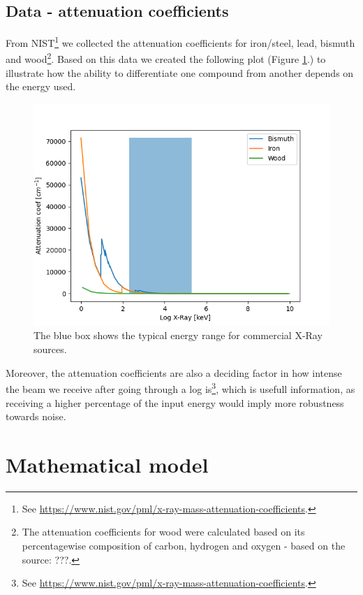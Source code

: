 \documentclass{article}
\begin{document}
\subsection{Data - attenuation coefficients} \label{NISTDATA}
From NIST\footnote{See \url{https://www.nist.gov/pml/x-ray-mass-attenuation-coefficients}.} we collected the attenuation coefficients for iron/steel, lead, bismuth and wood\footnote{The attenuation coefficients for wood were calculated based on its percentagewise composition of carbon, hydrogen and oxygen - based on the source: ???.}. Based on this data we created the following plot (Figure \ref{fig:all-NIST-attenuation-coef-data}.) to illustrate how the ability to differentiate one compound from another depends on the energy used.
\begin{figure}[H]
    \centering
    \includegraphics[scale=0.5]{images/all_NIST_attenuation_coef_data.png}
    \caption{The blue box shows the typical energy range for commercial X-Ray sources.}
    \label{fig:all-NIST-attenuation-coef-data}
\end{figure} 
\noindent Moreover, the attenuation coefficients are also a deciding factor in how intense the beam we receive after going through a log is\footnote{See \url{https://www.nist.gov/pml/x-ray-mass-attenuation-coefficients}.}, which is usefull information, as receiving a higher percentage of the input energy would imply more robustness towards noise.

\section{Mathematical model}
\end{document}
